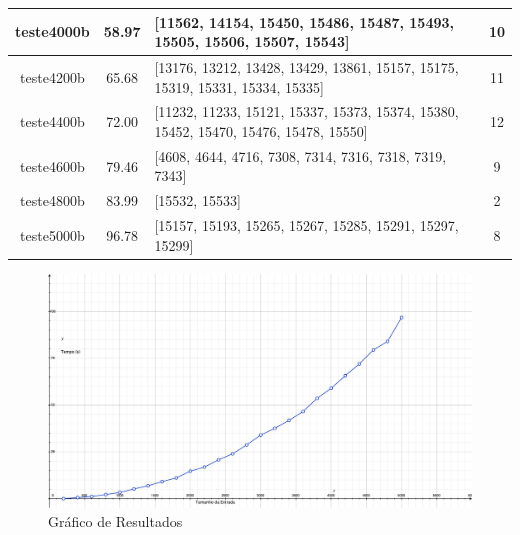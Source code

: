 \documentclass[12pt]{article}
\begin{document}
\begin{table}[h]
\begin{tabular}{c | c || p{9cm} | c}
  \hline
  teste4000b & 58.97 & [11562, 14154, 15450, 15486, 15487, 15493, 15505, 15506, 15507, 15543] & 10 \\
  \hline
  teste4200b & 65.68 & [13176, 13212, 13428, 13429, 13861, 15157, 15175, 15319, 15331, 15334, 15335] & 11 \\
  \hline
  teste4400b & 72.00 & [11232, 11233, 15121, 15337, 15373, 15374, 15380, 15452, 15470, 15476, 15478, 15550] & 12 \\
  \hline
  teste4600b & 79.46 & [4608, 4644, 4716, 7308, 7314, 7316, 7318, 7319, 7343] & 9 \\
  \hline
  teste4800b & 83.99 & [15532, 15533] & 2 \\
  \hline
  teste5000b & 96.78 & [15157, 15193, 15265, 15267, 15285, 15291, 15297, 15299] & 8
\end{tabular}
\end{table}

\begin{figure}[h!]
  \centering
  \includegraphics[width=15cm]{results.jpg}
  \caption{Gráfico de Resultados}
  \label{fig:resultados}
\end{figure}
\end{document}
